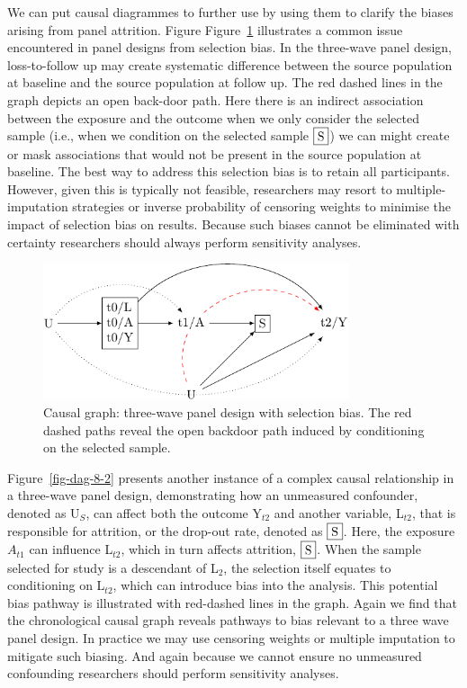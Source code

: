 \documentclass[
  singlecolumn]{report}
\begin{document}
We can put causal diagrammes to further use by using them to clarify the
biases arising from panel attrition. Figure Figure~\ref{fig-dag-8}
illustrates a common issue encountered in panel designs from selection
bias. In the three-wave panel design, loss-to-follow up may create
systematic difference between the source population at baseline and the
source population at follow up. The red dashed lines in the graph
depicts an open back-door path. Here there is an indirect association
between the exposure and the outcome when we only consider the selected
sample (i.e., when we condition on the selected sample \(\framebox{S}\))
we can might create or mask associations that would not be present in
the source population at baseline. The best way to address this
selection bias is to retain all participants. However, given this is
typically not feasible, researchers may resort to multiple-imputation
strategies or inverse probability of censoring weights to minimise the
impact of selection bias on results. Because such biases cannot be
eliminated with certainty researchers should always perform sensitivity
analyses.

\begin{figure}

{\centering \includegraphics[width=0.8\textwidth,height=\textheight]{causal-dags_files/figure-pdf/fig-dag-8-1.pdf}

}

\caption{\label{fig-dag-8}Causal graph: three-wave panel design with
selection bias. The red dashed paths reveal the open backdoor path
induced by conditioning on the selected sample.}

\end{figure}

Figure~\ref{fig-dag-8-2} presents another instance of a complex causal
relationship in a three-wave panel design, demonstrating how an
unmeasured confounder, denoted as U\(_S\), can affect both the outcome
Y\(_{t2}\) and another variable, L\(_{t2}\), that is responsible for
attrition, or the drop-out rate, denoted as \(\framebox{S}\). Here, the
exposure \(A_{t1}\) can influence L\(_{t2}\), which in turn affects
attrition, \(\framebox{S}\). When the sample selected for study is a
descendant of L\(_2\), the selection itself equates to conditioning on
L\(_{t2}\), which can introduce bias into the analysis. This potential
bias pathway is illustrated with red-dashed lines in the graph. Again we
find that the chronological causal graph reveals pathways to bias
relevant to a three wave panel design. In practice we may use censoring
weights or multiple imputation to mitigate such biasing. And again
because we cannot ensure no unmeasured confounding researchers should
perform sensitivity analyses.
\end{document}
